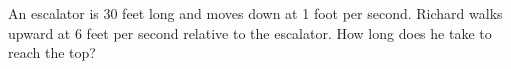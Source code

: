 An escalator is 30 feet long and moves down at 1 foot per second. Richard walks upward at 6 feet per second relative to the escalator. How long does he take to reach the top?
